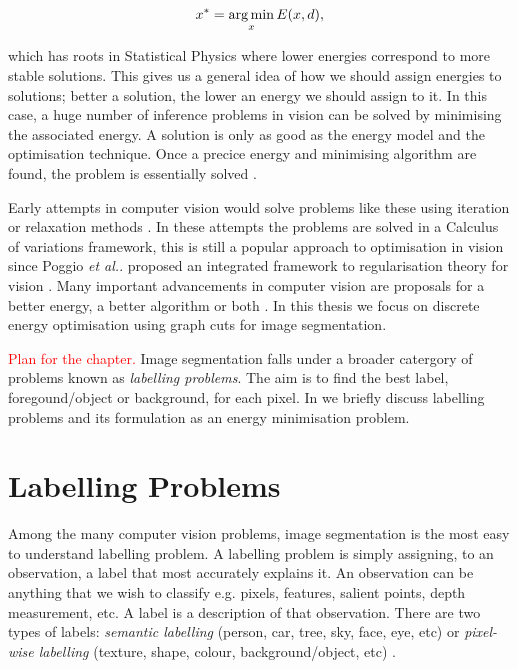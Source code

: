 \begin{equation}
	x^{*} = \operatorname*{arg\,min}_{x}E(x,d),
	\label{eq:gibbsenergy}
\end{equation}

which has roots in Statistical Physics where lower energies correspond to more stable solutions.
This gives us a general idea of how we should assign energies to solutions; better a solution, the lower an energy we should assign to it.
In this case, a huge number of inference problems in vision can be solved by minimising the associated energy.
A solution is only as good as the energy model and the optimisation technique. Once a precice energy and minimising algorithm are found, the problem is essentially solved \citep{Delong2011}. 

Early attempts in computer vision would solve problems like these using iteration or relaxation methods \citep{Waltz1975,Rosenfeld1976}.
In these attempts the problems are solved in a Calculus of variations framework, this is still a popular approach to optimisation in vision since Poggio \textit{et al.}. \citep{Poggio1985} proposed an integrated framework to regularisation theory for vision \citep{Sakaue1999}.
Many important advancements in computer vision are proposals for a better energy, a better algorithm or both \citep{Delong2011,Boykov2001,Kolmogorov2005,Mumford1989,Shi1997}.
In this thesis we focus on discrete energy optimisation using graph cuts for image segmentation.

\textcolor{red}{Plan for the chapter.}
Image segmentation falls under a broader catergory of problems known as \textit{labelling problems}.
The aim is to find the best label, foregound/object or background, for each pixel.
In  we briefly discuss labelling problems and its formulation as an energy minimisation problem.


\section{Labelling Problems}
\label{sec:LabellingProblems}

Among the many computer vision problems, image segmentation is the most easy to understand labelling problem.
A labelling problem is simply assigning, to an observation, a label that most accurately explains it.
An observation can be anything that we wish to classify e.g. pixels, features, salient points, depth measurement, etc.
A label is a description of that observation.
There are two types of labels: \textit{semantic labelling} (person, car, tree, sky, face, eye, etc) or \textit{pixel-wise labelling} (texture, shape, colour, background/object, etc) \citep{Delong2011,Athanasiadis2007}.

